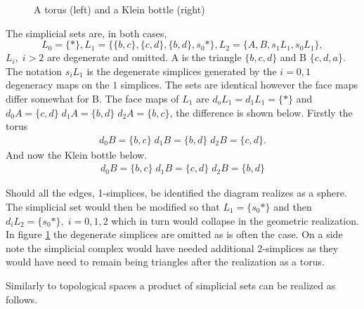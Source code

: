 \documentclass[../../main.tex]{subfiles}
\begin{document}
\begin{example}
\begin{figure}[H]
\begin{subfigure}[b]{0.3\textwidth}
        \end{subfigure}
        \caption{A torus (left) and a Klein bottle (right)}
        \label{fig:squares}
        \end{figure}
        The simplicial sets are, in both cases, 
        \[L_0=\{*\}, L_1=\{\{b,c\},\{c,d\},\{b,d\},s_0*\}, L_2=\{A,B,s_1L_1,s_0L_1\},\] $L_i,\; i>2$ are degenerate and omitted. A is the triangle $\{b,c,d\}$ and B $\{c,d,a\}$. The notation $s_iL_1$ is the degenerate simplices generated by the $i=0,1$ degeneracy maps on the $1$ simplices. The sets are identical however the face maps differ somewhat for B. The face maps of $L_1$ are $d_oL_1=d_1L_1=\{*\}$ and $d_0A=\{c,d\} \; d_1A = \{b,d\} \; d_2A=\{b,c\}$, the difference is shown below. Firstly the torus 
        \begin{align*}
            d_0B=\{b,c\} \; d_1B = \{b,d\} \; d_2B=\{c,d\}.
        \end{align*}
        And now the Klein bottle below.
        \begin{align*}
            d_0B=\{b,c\} \; d_1B = \{c,d\} \; d_2B=\{b,d\}
        \end{align*}

        Should all the edges, 1-simplices, be identified the diagram realizes as a sphere. The simplicial set would then be modified so that $L_1=\{s_0*\}$ and then $d_iL_2=\{s_0*\},\; i=0,1,2$ which in turn would collapse in the geometric realization. In figure \ref{fig:squares} the degenerate simplices are omitted as is often the case. On a side note the simplicial complex would have needed additional 2-simplices as they would have need to remain being triangles after the realization as a torus.
    \end{example}

    Similarly to topological spaces a product of simplicial sets can be realized as follows.
\end{document}
